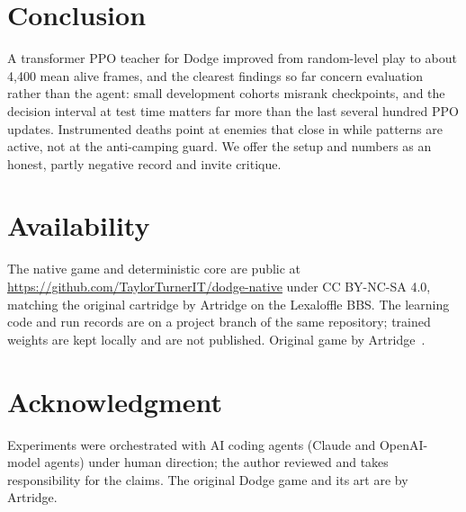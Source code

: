 \documentclass[journal]{IEEEtran}
\begin{document}
\section{Conclusion}
A transformer PPO teacher for Dodge improved from random-level play to about 4{,}400 mean alive frames, and the clearest findings so far concern evaluation rather than the agent: small development cohorts misrank checkpoints, and the decision interval at test time matters far more than the last several hundred PPO updates. Instrumented deaths point at enemies that close in while patterns are active, not at the anti-camping guard. We offer the setup and numbers as an honest, partly negative record and invite critique.

\section*{Availability}
The native game and deterministic core are public at \url{https://github.com/TaylorTurnerIT/dodge-native}  under CC BY-NC-SA 4.0, matching the original cartridge by Artridge on the Lexaloffle BBS. The learning code and run records are on a project branch of the same repository; trained weights are kept locally and are not published. Original game by Artridge~\cite{artridge}.

\section*{Acknowledgment}
Experiments were orchestrated with AI coding agents (Claude and OpenAI-model agents) under human direction; the author reviewed and takes responsibility for the claims. The original Dodge game and its art are by Artridge.



\end{document}
